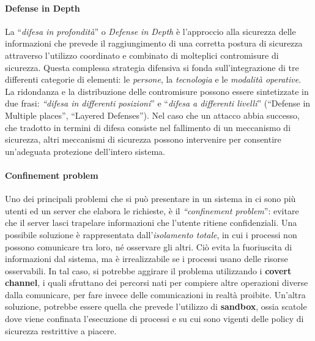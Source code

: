 \paragraph{Defense in Depth}
La “\textit{difesa in profondità}” o \textit{Defense in Depth} è
l'approccio alla sicurezza delle informazioni che
prevede il raggiungimento di una corretta postura di sicurezza attraverso
l'utilizzo coordinato e combinato di molteplici contromisure di sicurezza.
Questa complessa strategia difensiva si fonda sull'integrazione di tre differenti
categorie di elementi: le \textit{persone}, la \textit{tecnologia} e le
\textit{modalità operative}. La ridondanza e la distribuzione delle
contromisure possono essere sintetizzate in due
frasi: \textit{“difesa in differenti posizioni}” e
“\textit{difesa a differenti livelli}”
(“Defense in Multiple places”, “Layered Defenses”).
Nel caso che un attacco abbia successo, che tradotto in termini di difesa
consiste nel fallimento di un meccanismo di sicurezza, altri meccanismi di
sicurezza possono intervenire per consentire un'adeguata protezione dell'intero
sistema.

\paragraph{Confinement problem}
Uno dei principali problemi che si può presentare in un sistema in ci sono più
utenti ed un server che elabora le richieste, è il \textit{“confinement problem}”:
evitare che il server lasci trapelare informazioni che l'utente ritiene
confidenziali.
Una possibile soluzione è rappresentata dall’\textit{isolamento totale},
in cui i processi non possono comunicare tra loro, né osservare gli altri.
Ciò evita la fuoriuscita di informazioni dal sistema, ma è
irrealizzabile se i processi usano delle risorse osservabili. In tal caso,
si potrebbe aggirare il
problema utilizzando i \textbf{covert channel}, i quali sfruttano dei percorsi
nati per compiere altre operazioni diverse dalla comunicare, per fare invece
delle comunicazioni in realtà proibite. Un’altra
soluzione, potrebbe essere quella che prevede l’utilizzo di \textbf{sandbox},
ossia scatole dove viene confinata l'esecuzione di processi e su cui sono
vigenti delle policy di sicurezza restrittive a piacere.